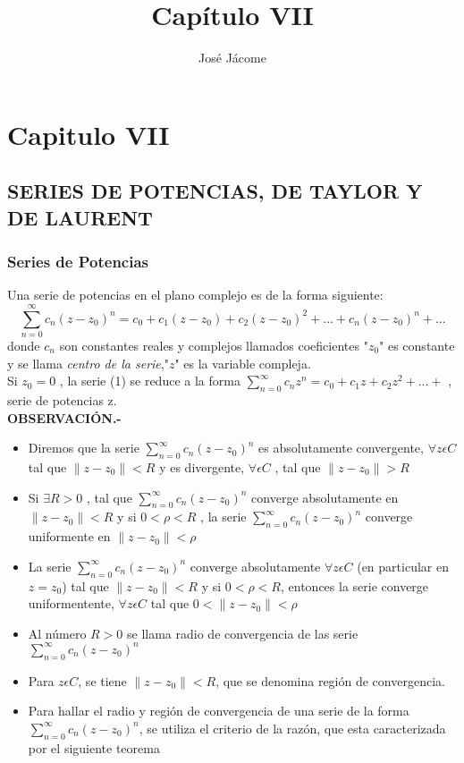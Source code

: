 \documentclass[10pt,a4paper]{article}
\author{José Jácome}
\title{Capítulo VII}
\begin{document}
\chapter{Capitulo VII}
\section{SERIES DE POTENCIAS, DE TAYLOR Y DE LAURENT}
\subsection{Series de Potencias}
Una serie de potencias en el plano complejo es de la forma siguiente:
\begin{equation}
\sum_{n = 0}^{\infty} c_n (z-z_0)^n = c_0 + c_1(z-z_0) + c_2 (z-z_0)^2 + ... +  c_n (z-z_0)^n + ...
\end{equation}
donde $c_n$ son constantes reales y complejos llamados coeficientes "$z_0$" es constante y se llama \textit{centro de la serie},"$z$" es la variable compleja. \\
Si $z_0 = 0$ , la serie (1) se reduce a la forma $\displaystyle{\sum_{n = 0}^{\infty} c_n z^n = c_0 + c_1 z + c_2 z^2 + ... + }$ , serie de potencias z.\\
\textbf{OBSERVACIÓN.-}
\begin{itemize}
\item Diremos que la serie $\displaystyle{\sum_{n = 0}^{\infty} c_n (z-z_0)^n}$ es absolutamente convergente, $\forall z \epsilon C$ tal que $ \parallel z - z_0 \parallel  < R$ y es divergente, $\forall \epsilon  C$ , tal que $\parallel z - z_0 \parallel > R$
\item Si $\exists R > 0$ , tal que $\displaystyle{\sum_{n = 0}^{\infty} c_n (z-z_0)^n}$ converge absolutamente en $\parallel z - z_0 \parallel < R$ y si $0 < \rho < R$ , la serie $\displaystyle{\sum_{n = 0}^{\infty} c_n (z-z_0)^n}$ converge uniformente en $\parallel z - z_0 \parallel < \rho$
\item La serie $\displaystyle{\sum_{n = 0}^{\infty} c_n (z-z_0)^n}$ converge absolutamente  $\forall z \epsilon C$ (en particular en $z = z_0$) tal que $\parallel z - z_0 \parallel < R $ y si $0 < \rho < R$, entonces la serie converge uniformentente, $\forall z \epsilon C$ tal que $0< \parallel z - z_0 \parallel < \rho$
\item Al número $R > 0$ se llama radio de convergencia de las serie $\displaystyle{\sum_{n = 0}^{\infty} c_n (z-z_0)^n}$
\item Para $z \epsilon C$, se tiene $\parallel z - z_0 \parallel < R$, que se denomina región de convergencia.

\item Para hallar el radio y región de convergencia de una serie de la forma $\displaystyle{\sum_{n = 0}^{\infty} c_n (z-z_0)^n}$, se utiliza el criterio de la razón, que esta caracterizada por el siguiente teorema
\end{itemize}
\end{document}
